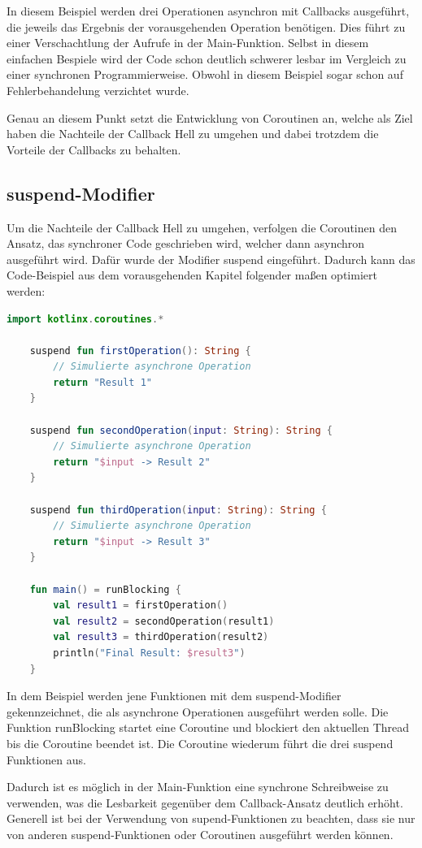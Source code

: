 \documentclass[fontsize=12pt,paper=a4,twoside=semi,parskip=half-,headsepline,headinclude]{scrreprt}
\begin{document}
In diesem Beispiel werden drei Operationen asynchron mit Callbacks ausgeführt, die jeweils das Ergebnis der vorausgehenden Operation benötigen. Dies führt zu einer Verschachtlung der Aufrufe in der Main-Funktion. Selbst in diesem einfachen Bespiele wird der Code schon deutlich schwerer lesbar im Vergleich zu einer synchronen Programmierweise. Obwohl in diesem Beispiel sogar schon auf Fehlerbehandelung verzichtet wurde.

Genau an diesem Punkt setzt die Entwicklung von Coroutinen an, welche als Ziel haben die Nachteile der Callback Hell zu umgehen und dabei trotzdem die Vorteile der Callbacks zu behalten.


\subsection{suspend-Modifier}

Um die Nachteile der Callback Hell zu umgehen, verfolgen die Coroutinen den Ansatz, das synchroner Code geschrieben wird, welcher dann asynchron ausgeführt wird. Dafür wurde der Modifier suspend eingeführt. Dadurch kann das Code-Beispiel aus dem vorausgehenden Kapitel folgender maßen optimiert werden:

\begin{lstlisting}[language=Kotlin]
	import kotlinx.coroutines.*
	
	suspend fun firstOperation(): String {
		// Simulierte asynchrone Operation
		return "Result 1"
	}
	
	suspend fun secondOperation(input: String): String {
		// Simulierte asynchrone Operation
		return "$input -> Result 2"
	}
	
	suspend fun thirdOperation(input: String): String {
		// Simulierte asynchrone Operation
		return "$input -> Result 3"
	}
	
	fun main() = runBlocking {
		val result1 = firstOperation()
		val result2 = secondOperation(result1)
		val result3 = thirdOperation(result2)
		println("Final Result: $result3")
	}
\end{lstlisting}

In dem Beispiel werden jene Funktionen mit dem suspend-Modifier gekennzeichnet, die als asynchrone Operationen ausgeführt werden solle. Die Funktion runBlocking startet eine Coroutine und blockiert den aktuellen Thread bis die Coroutine beendet ist. Die Coroutine wiederum führt die drei suspend Funktionen aus.

Dadurch ist es möglich in der Main-Funktion eine synchrone Schreibweise zu verwenden, was die Lesbarkeit gegenüber dem Callback-Ansatz deutlich erhöht. Generell ist bei der Verwendung von supend-Funktionen zu beachten, dass sie nur von anderen suspend-Funktionen oder Coroutinen ausgeführt werden können.
\end{document}
